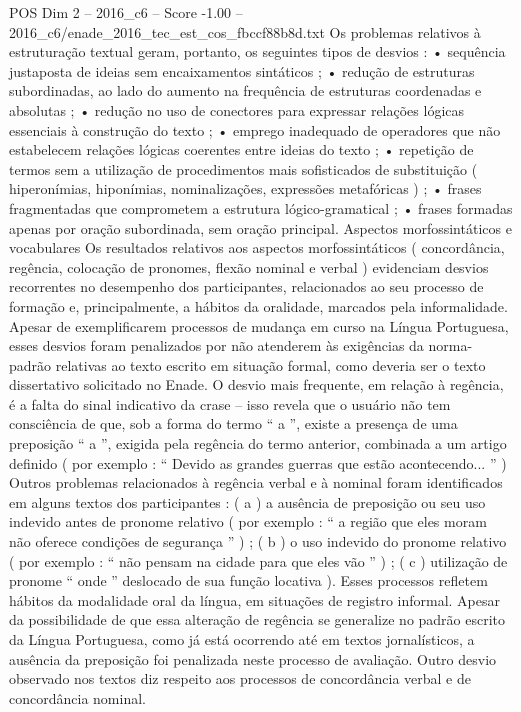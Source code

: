 \begin{textsample}{POS Dim 2 – 2016\_c6 – Score -1.00 – 2016\_c6/enade\_2016\_tec\_est\_cos\_fbccf88b8d.txt}
Os problemas relativos à estruturação textual geram, portanto, os seguintes tipos de desvios : • sequência justaposta de ideias sem encaixamentos sintáticos ; • redução de estruturas subordinadas, ao lado do aumento na frequência de estruturas coordenadas e absolutas ; • redução no uso de conectores para expressar relações lógicas essenciais à construção do texto ; • emprego inadequado de operadores que não estabelecem relações lógicas coerentes entre ideias do texto ; • repetição de termos sem a utilização de procedimentos mais sofisticados de substituição ( hiperonímias, hiponímias, nominalizações, expressões metafóricas ) ; • frases fragmentadas que comprometem a estrutura lógico-gramatical ; • frases formadas apenas por oração subordinada, sem oração principal.
Aspectos morfossintáticos e vocabulares Os resultados relativos aos aspectos morfossintáticos ( concordância, regência, colocação de pronomes, flexão nominal e verbal ) evidenciam desvios recorrentes no desempenho dos participantes, relacionados ao seu processo de formação e, principalmente, a hábitos da oralidade, marcados pela informalidade.
Apesar de exemplificarem processos de mudança em curso na Língua Portuguesa, esses desvios foram penalizados por não atenderem às exigências da norma-padrão relativas ao texto escrito em situação formal, como deveria ser o texto dissertativo solicitado no Enade.
O desvio mais frequente, em relação à regência, é a falta do sinal indicativo da crase – isso revela que o usuário não tem consciência de que, sob a forma do termo “ a ”, existe a presença de uma preposição “ a ”, exigida pela regência do termo anterior, combinada a um artigo definido ( por exemplo : “ Devido as grandes guerras que estão acontecendo... ” ) Outros problemas relacionados à regência verbal e à nominal foram identificados em alguns textos dos participantes : ( a ) a ausência de preposição ou seu uso indevido antes de pronome relativo ( por exemplo : “ a região que eles moram não oferece condições de segurança ” ) ; ( b ) o uso indevido do pronome relativo ( por exemplo : “ não pensam na cidade para que eles vão ” ) ; ( c ) utilização de pronome “ onde ” deslocado de sua função locativa ).
Esses processos refletem hábitos da modalidade oral da língua, em situações de registro informal.
Apesar da possibilidade de que essa alteração de regência se generalize no padrão escrito da Língua Portuguesa, como já está ocorrendo até em textos jornalísticos, a ausência da preposição foi penalizada neste processo de avaliação.
Outro desvio observado nos textos diz respeito aos processos de concordância verbal e de concordância nominal.

\end{textsample}
